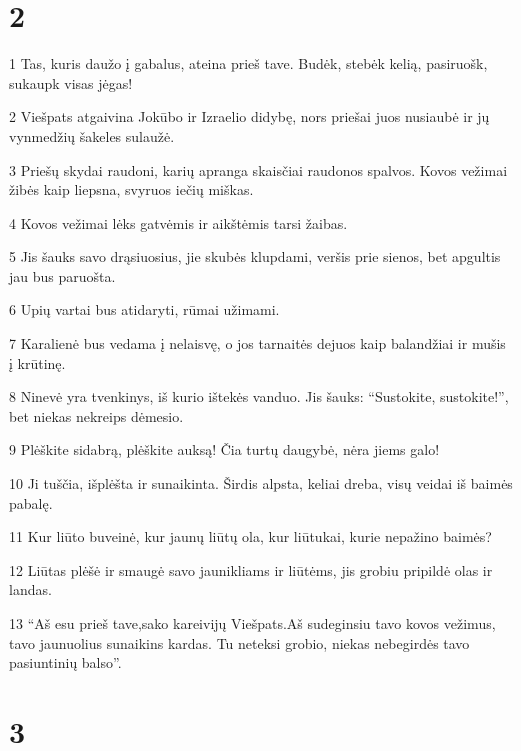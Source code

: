 \chapter{2}


\par 1 Tas, kuris daužo į gabalus, ateina prieš tave. Budėk, stebėk kelią, pasiruošk, sukaupk visas jėgas! 
\par 2 Viešpats atgaivina Jokūbo ir Izraelio didybę, nors priešai juos nusiaubė ir jų vynmedžių šakeles sulaužė. 
\par 3 Priešų skydai raudoni, karių apranga skaisčiai raudonos spalvos. Kovos vežimai žibės kaip liepsna, svyruos iečių miškas. 
\par 4 Kovos vežimai lėks gatvėmis ir aikštėmis tarsi žaibas. 
\par 5 Jis šauks savo drąsiuosius, jie skubės klupdami, veršis prie sienos, bet apgultis jau bus paruošta. 
\par 6 Upių vartai bus atidaryti, rūmai užimami. 
\par 7 Karalienė bus vedama į nelaisvę, o jos tarnaitės dejuos kaip balandžiai ir mušis į krūtinę. 
\par 8 Ninevė yra tvenkinys, iš kurio ištekės vanduo. Jis šauks: “Sustokite, sustokite!”, bet niekas nekreips dėmesio. 
\par 9 Plėškite sidabrą, plėškite auksą! Čia turtų daugybė, nėra jiems galo! 
\par 10 Ji tuščia, išplėšta ir sunaikinta. Širdis alpsta, keliai dreba, visų veidai iš baimės pabalę. 
\par 11 Kur liūto buveinė, kur jaunų liūtų ola, kur liūtukai, kurie nepažino baimės? 
\par 12 Liūtas plėšė ir smaugė savo jaunikliams ir liūtėms, jis grobiu pripildė olas ir landas. 
\par 13 “Aš esu prieš tave,­sako kareivijų Viešpats.­Aš sudeginsiu tavo kovos vežimus, tavo jaunuolius sunaikins kardas. Tu neteksi grobio, niekas nebegirdės tavo pasiuntinių balso”.



\chapter{3}


